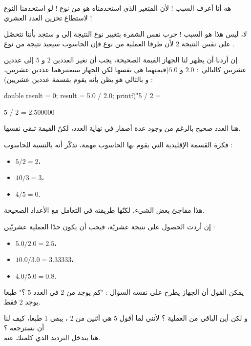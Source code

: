 \begin{question}
  هه أنا أعرف السبب ! لأن المتغير
  الذي استخدمناه هو من نوع
   !
  لو استخدمنا النوع
  لاستطاع تخزين العدد العشري !
\end{question}

لا، ليس هذا هو السبب ! جرب  نفس الشفرة بتغيير نوع النتيجة إلى
و ستجد بأننا نتحصّل على نفس النتيجة 2 لأن طرفا العملية من نوع
فإن الحاسوب سيعيد نتيجة من نوع
.

إن أردنا أن يظهر لنا الجهاز القيمة الصحيحة، يجب أن نغير العددين $ 2 $ و $ 5 $ إلى عددين عشريين كالتالي~: $ 2.0 $ و $ 5.0  $(قيمتهما هي نفسها لكن الجهاز سيعتبرهما عددين عشريين، و بالتالي هو يظن بأنه يقوم بقسمة عددين عشريين) :

\begin{Csource}
  double result = 0;
  result = 5.0 / 2.0;
  printf("5 / 2 =  %
\end{Csource}

\begin{Console}
  5 / 2 = 2.500000
\end{Console}

هنا العدد صحيح بالرغم من وجود عدة أصفار في نهاية العدد، لكنّ القيمة تبقى نفسها.

فكرة القسمة الإقليدية التي يقوم بها الحاسوب مهمة، تذكّر أنه بالنسبة للحاسوب :

\begin{itemize}
  \item $ 5 / 2 = 2 $،
  \item $ 10 / 3 = 3 $،
  \item $ 4 / 5 = 0 $.
\end{itemize}

هذا مفاجئ بعض الشيء، لكنّها طريقته في التعامل مع الأعداد الصحيحة.

إن أردت الحصول على نتيجة عشريّة، فيجب أن يكون حدّا العملية عشريّين :

\begin{itemize}
  \item $ 5.0 / 2.0 = 2.5 $،
  \item $ 10.0 / 3.0 = 3.33333 $،
  \item $ 4.0 / 5.0 = 0.8 $.
\end{itemize}

يمكن القول أن الجهاز يطرح على نفسه السؤال : "كم يوجد من 2 في العدد 5 ؟" طبعا يوجد 2 فقط.

و لكن أين الباقي من العملية ؟ لأنني لما أقول 5 هي أثنين من 2 ، يبقى 1 طبعا، كيف لنا أن نسترجعه ؟\\
هنا يتدخل الترديد الذي كلمتك عنه.

